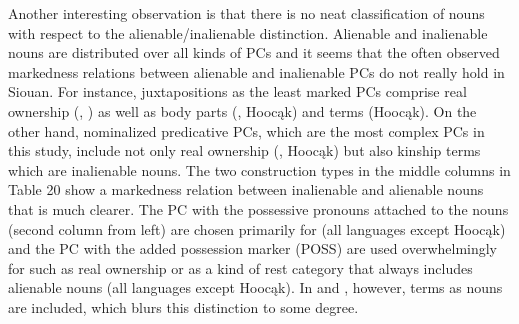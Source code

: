 \documentclass[output=paper]{LSP/langsci}
\begin{document}
Another interesting observation is that there is no neat classification of nouns with respect to the alienable/inalienable distinction. Alienable and inalienable nouns are distributed over all kinds of PCs and it seems that the often observed markedness relations between alienable and inalienable PCs do not really hold in Siouan. For instance, juxtapositions as the least marked PCs comprise real ownership (, ) as well as body parts (, Hoocąk) and  terms (Hoocąk). On the other hand, nominalized predicative PCs, which are the most complex PCs in this study, include not only real ownership (, Hoocąk) but also kinship terms which are inalienable nouns. The two construction types in the middle columns in Table 20 show a markedness relation between inalienable and alienable nouns that is much clearer. The PC with the possessive pronouns attached to the  nouns (second column from left) are chosen primarily for  (all languages except Hoocąk) and the PC with the added possession marker (\textsc{POSS}) are used overwhelmingly for  such as real ownership or as a kind of rest category that always includes alienable nouns (all languages except Hoocąk). In  and , however,  terms as  nouns are included, which blurs this distinction to some degree. 
 

 
 
 
 
 
\end{document}
